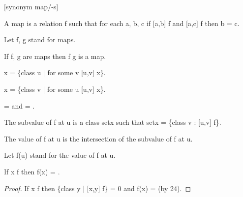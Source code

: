 \documentclass[a4paper,draft]{amsproc}
\begin{document}
\begin{forthel}


[synonym map/-s]
\begin{definition}[63]
A map is a relation f such that for each a, b, c
if [a,b] \in f and [a,c] \in f then b = c.
\end{definition}

Let f, g stand for maps.

\begin{theorem}[64]
If f, g are maps then f \circ g is a map.
\end{theorem}


\begin{definition}[65]
\domain x = \{class u | for some v [u,v] \in x\}.
\end{definition}

\begin{definition}[66]
\range x = \{class v | for some u [u,v] \in x\}.
\end{definition}

\begin{theorem}[67]
\domain {} =  and \range {} = .
\end{theorem}

\begin{definition}
The subvalue of f at u is a class setx such that setx = \{class v : [u,v] \in f\}.
\end{definition}

\begin{signature}[68]
The value of f at u is the intersection of the subvalue of f at u.
\end{signature}
Let f(u) stand for the value of f at u.


\begin{theorem}[69a]
If x \notin \domain f then f(x) = .
\end{theorem}
\begin{proof}
If x \notin \domain f 
then \{class y | [x,y] \in f\} = 0 and f(x) =  (by 24).
\end{proof}


\end{forthel}
\end{document}
